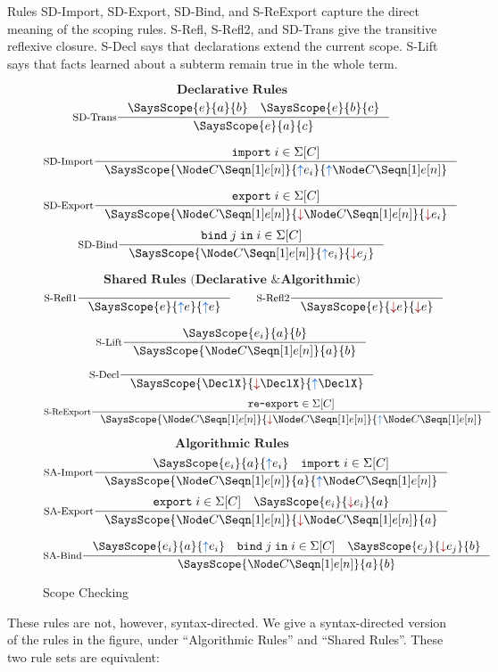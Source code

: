 Rules SD-Import, SD-Export, SD-Bind, and S-ReExport capture the
direct meaning of the scoping rules.
S-Refl, S-Refl2, and SD-Trans give the transitive reflexive
closure.
S-Decl says that declarations extend the current scope.
S-Lift says that facts learned about a subterm remain true in
the whole term.

\begin{figure}[h!t]
  \begin{flushleft}
    \hspace{5em}
  \end{flushleft}
  \[ \textbf{Declarative Rules} \]
  \[
  \inference[SD-Trans]
      {\SaysScope{e}{a}{b} \quad \SaysScope{e}{b}{c}}
      {\SaysScope{e}{a}{c}}
  \]

  \[
  \inference[SD-Import]
      {\SigPImpt{i}}
      {\SaysScope{\NodeStd}{\im e_i}{\im \NodeStd}}
  \]

  \[
  \inference[SD-Export]
      {\SigPExpt{i}}
      {\SaysScope{\NodeStd}{\ex{}\NodeStd}{\ex e_i}}
  \]
  \[
  \inference[SD-Bind]
      {\SigPBind{i}{j}}
      {\SaysScope{\NodeStd}{\im e_i}{\ex e_j}}
  \]

  \[ \textbf{Shared Rules (Declarative \& Algorithmic)} \]
  \[
  \inference[S-Refl1]
      {}
      {\SaysScope{e}{\im e}{\im e}}
  \qquad
  \inference[S-Refl2]
      {}
      {\SaysScope{e}{\ex e}{\ex e}}
  \]

  \[    
  \inference[S-Lift]
      {\SaysScope{e_i}{a}{b}}
      {\SaysScope{\NodeStd}{a}{b}}
  \]

  \[
  \inference[S-Decl]
      {}
      {\SaysScope{\DeclX}{\ex{}\DeclX}{\im{}\DeclX}}
  \]
  \[
  \inference[S-ReExport]
      {\SigPSelf}
      {\SaysScope{\NodeStd}{\ex{}\NodeStd}{\im{}\NodeStd}}
  \]

  \[ \textbf{Algorithmic Rules} \]
  \[
  \inference[SA-Import]
      {\SaysScope{e_i}{a}{\im e_i} \quad
       \SigPImpt{i}}
      {\SaysScope{\NodeStd}{a}{\im{}\NodeStd}}
  \]
  \[
  \inference[SA-Export]
      {\SigPExpt{i} \quad
       \SaysScope{e_i}{\ex e_i}{a}}
      {\SaysScope{\NodeStd}{\ex{}\NodeStd}{a}}
  \]

  \[
  \inference[SA-Bind]
      {\SaysScope{e_i}{a}{\im e_i} \quad
       \SigPBind{i}{j} \quad
       \SaysScope{e_j}{\ex e_j}{b}}
      {\SaysScope{\NodeStd}{a}{b}}
  \]

\caption{Scope Checking}
\label{fig:rscope-SD}
\end{figure}

These rules are not, however, syntax-directed. We give a
syntax-directed version of the rules in the figure, under
``Algorithmic Rules'' and ``Shared Rules''.
These two rule sets are equivalent:

